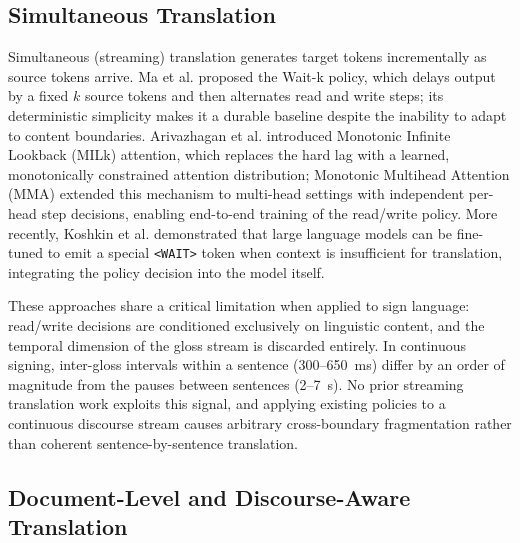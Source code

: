 \documentclass[conference]{IEEEtran}
\begin{document}
\subsection{Simultaneous Translation}

Simultaneous (streaming) translation generates target tokens incrementally as source tokens arrive. Ma et al. \cite{ma2019stacl} proposed the Wait-k policy, which delays output by a fixed $k$ source tokens and then alternates read and write steps; its deterministic simplicity makes it a durable baseline despite the inability to adapt to content boundaries. Arivazhagan et al. \cite{arivazhagan2019monotonic} introduced Monotonic Infinite Lookback (MILk) attention, which replaces the hard lag with a learned, monotonically constrained attention distribution; Monotonic Multihead Attention (MMA) \cite{ma2020monotonic} extended this mechanism to multi-head settings with independent per-head step decisions, enabling end-to-end training of the read/write policy. More recently, Koshkin et al. \cite{koshkin2024transllama} demonstrated that large language models can be fine-tuned to emit a special \texttt{<WAIT>} token when context is insufficient for translation, integrating the policy decision into the model itself.

These approaches share a critical limitation when applied to sign language: read/write decisions are conditioned exclusively on linguistic content, and the temporal dimension of the gloss stream is discarded entirely. In continuous signing, inter-gloss intervals within a sentence (300--650~ms) differ by an order of magnitude from the pauses between sentences (2--7~s). No prior streaming translation work exploits this signal, and applying existing policies to a continuous discourse stream causes arbitrary cross-boundary fragmentation rather than coherent sentence-by-sentence translation.

\subsection{Document-Level and Discourse-Aware Translation}
\end{document}
